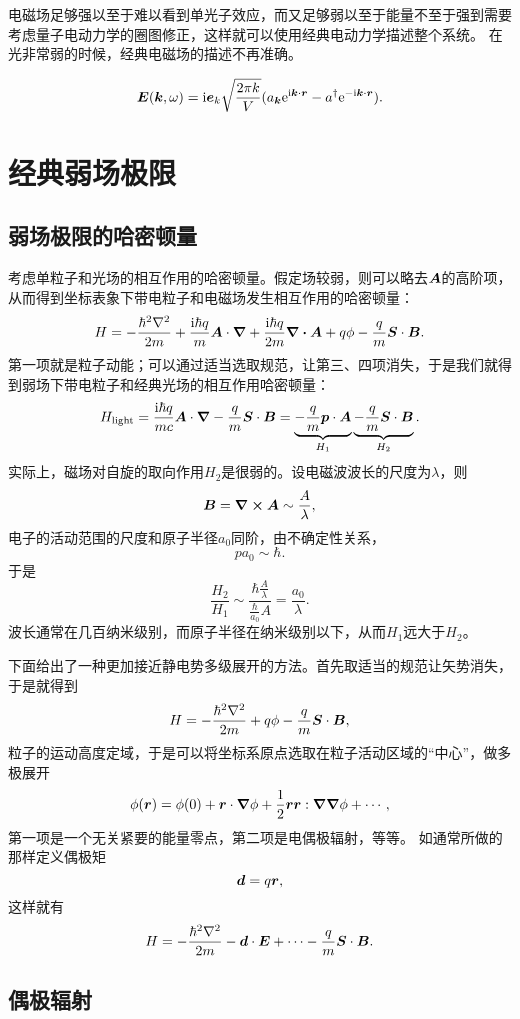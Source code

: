 \documentclass[UTF8, a4paper]{ctexart}
\newcommand*{\ee}{\mathrm{e}}
\newcommand*{\ii}{\mathrm{i}}
\begin{document}
电磁场足够强以至于难以看到单光子效应，而又足够弱以至于能量不至于强到需要考虑量子电动力学的圈图修正，这样就可以使用经典电动力学描述整个系统。
在光非常弱的时候，经典电磁场的描述不再准确。

\begin{equation}
    \vb*{E}(\vb*{k}, \omega) = \ii \vb*{e}_k \sqrt{\frac{2\pi k}{V}} (a_{\vb*{k}} \ee^{\ii \vb*{k} \cdot \vb*{r}} - a^\dagger \ee^{-\ii \vb*{k} \cdot \vb*{r}}).
\end{equation}

\section{经典弱场极限}

\subsection{弱场极限的哈密顿量}

考虑单粒子和光场的相互作用的哈密顿量。假定场较弱，则可以略去$\vb*{A}$的高阶项，从而得到坐标表象下带电粒子和电磁场发生相互作用的哈密顿量：
\[
    {H} = - \frac{\hbar^2 \laplacian}{2m} + \frac{\ii \hbar q}{m} \vb*{A} \cdot \grad + \frac{\ii \hbar q}{2 m} \div\vb*{A} + q \phi - \frac{q}{m} {\vb*{S}} \cdot \vb*{B}.
\]
第一项就是粒子动能；可以通过适当选取规范，让第三、四项消失，于是我们就得到弱场下带电粒子和经典光场的相互作用哈密顿量：
\begin{equation}
    {H}_\text{light} = \frac{\ii \hbar q}{m c} \vb*{A} \cdot \grad - \frac{q}{m} {\vb*{S}} \cdot \vb*{B} = \underbrace{- \frac{q}{m} {\vb*{p}} \cdot \vb*{A}}_{{H}_\text{1}} \underbrace{- \frac{q}{m} {\vb*{S}} \cdot \vb*{B}}_{{H}_2}.
\end{equation}
实际上，磁场对自旋的取向作用${H}_2$是很弱的。设电磁波波长的尺度为$\lambda$，则
\[
    \vb*{B} = \curl{\vb*{A}} \sim \frac{A}{\lambda},
\]
电子的活动范围的尺度和原子半径$a_0$同阶，由不确定性关系，
\[
    p a_0 \sim \hbar.
\]
于是
\[
    \frac{H_2}{H_1} \sim \frac{\hbar \frac{A}{\lambda}}{\frac{\hbar}{a_0} A} = \frac{a_0}{\lambda}.
\]
波长通常在几百纳米级别，而原子半径在纳米级别以下，从而${H}_1$远大于${H}_2$。

下面给出了一种更加接近静电势多级展开的方法。首先取适当的规范让矢势消失，于是就得到
\[
    {H} = - \frac{\hbar^2 \laplacian}{2m} + q \phi - \frac{q}{m} {\vb*{S}} \cdot \vb*{B},
\]
粒子的运动高度定域，于是可以将坐标系原点选取在粒子活动区域的“中心”，做多极展开
\[
    \phi(\vb*{r}) = \phi(0) + \vb*{r} \cdot \grad{\phi} + \frac{1}{2} \vb*{r} \vb*{r} : \grad{\grad{\phi}} + \cdots,
\]
第一项是一个无关紧要的能量零点，第二项是电偶极辐射，等等。
如通常所做的那样定义偶极矩
\begin{equation}
    {\vb*{d}} = q {\vb*{r}},
\end{equation}
这样就有
\begin{equation}
    {H} = - \frac{\hbar^2 \laplacian}{2m} - {\vb*{d}} \cdot \vb*{E} + \cdots - \frac{q}{m} {\vb*{S}} \cdot \vb*{B}.
\end{equation}

\subsection{偶极辐射}
\end{document}
